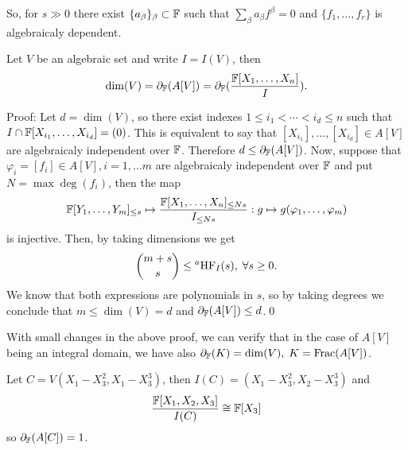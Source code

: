 \begin{itemize}
\begin{example}
    So, for $s\gg0$ there exist $\{a_\beta\}_\beta\subset\mathbb{F}$ such that 
    $\sum_{\beta}a_\beta f^\beta=0$ and $\{f_1,\dots, f_r\}$ is algebraicaly dependent.
    \end{example}
    \begin{theorem}
        Let $V$ be an algebraic set and write $I= I(V)$, then 
        \begin{equation}
            \dim(V) = \partial_{\mathbb{F}}(A[V])=\partial_{\mathbb{F}}(\frac{\mathbb{F}[X_1,\dots, X_n]}{I}).
        \end{equation}
    \end{theorem}
    Proof: Let $d=\dim(V)$, so there exist indexes $1\leq i_1<\cdots<i_d\leq n$ such that 
    $I\cap \mathbb{F}[X_{i_1},\dots,X_{i_d}]=(0)$. This is equivalent to say that 
    $[X_{i_1}],\dots, [X_{i_d}]\in A[V]$ are algebraicaly independent over $\mathbb{F}$. Therefore
    $d\leq \partial_{\mathbb{F}}(A[V])$. Now, suppose that $\varphi_i=[f_i]\in A[V],i=1,\dots m$ are 
    algebraicaly independent over $\mathbb{F}$ and put $N=\max{\deg(f_i)}$, then the map 
    \begin{equation}
        \mathbb{F}[Y_1,\dots, Y_m]_{\leq s}\mapsto \frac{\mathbb{F}[X_1,\dots,X_n]_{\leq Ns}}{I_{\leq Ns}}:g\mapsto g(\varphi_1,\dots,\varphi_m)
    \end{equation}
    is injective. Then, by taking dimensions we get
    \begin{equation}
     \binom{m+s}{s}  \leq \prescript{a}{}{}\text{HF}_{I}(s),\;\forall s\geq0. 
    \end{equation}
    We know that both expressions are polynomials in $s$, so by taking degrees we conclude that 
    $m\leq \dim(V) = d$ and $\partial_{\mathbb{F}}(A[V])\leq d$.\qed

    
    With small changes in the above proof, we can verify that in the case of $A[V]$ being an integral domain, we have 
    also $\partial_{\mathbb{F}}(K) = \dim(V),\;K=\text{Frac}(A[V])$.
\begin{example}
    Let $C=V(X_1-X_3^2,X_1-X_3^3)$, then $I(C)=(X_1-X_3^2,X_2-X_3^3)$ and 
    \begin{equation}
        \frac{\mathbb{F}[X_1,X_2,X_3]}{I(C)}\cong \mathbb{F}[X_3]
    \end{equation}
    so $\partial_{\mathbb{F}}(A[C])=1$.
\end{example}


\end{itemize}
